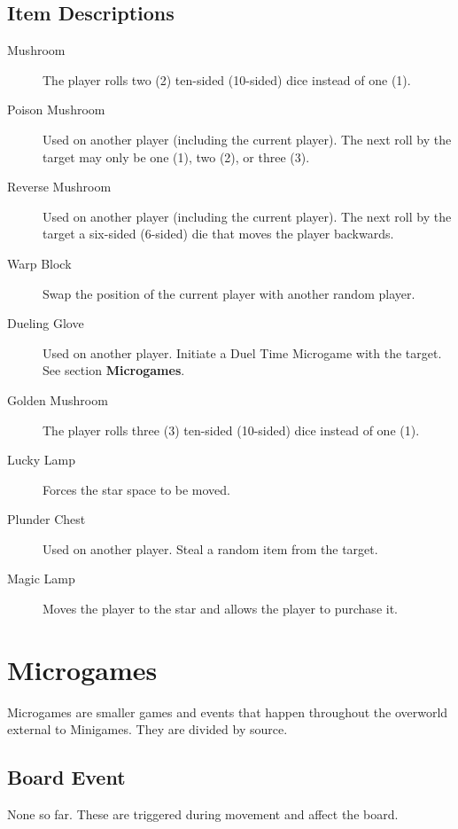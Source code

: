 \documentclass{article}
\begin{document}
\subsection{Item Descriptions}
\begin{description}
\item[Mushroom] The player rolls two (2) ten-sided (10-sided) dice instead
of one (1).

\item[Poison Mushroom] Used on another player (including the current player).
The next roll by the target may only be one (1), two (2), or three (3).

\item[Reverse Mushroom] Used on another player (including the current player).
The next roll by the target a six-sided (6-sided) die that moves the player backwards.

\item[Warp Block] Swap the position of the current player with another random player.

\item[Dueling Glove] Used on another player. Initiate a Duel Time Microgame with the target.
See section \textbf{Microgames}.

\item[Golden Mushroom] The player rolls three (3) ten-sided (10-sided) dice instead
of one (1).

\item[Lucky Lamp] Forces the star space to be moved.

\item[Plunder Chest] Used on another player. Steal a random item from the target.

\item[Magic Lamp] Moves the player to the star and allows the player to purchase it.
\end{description}

\section{Microgames}

Microgames are smaller games and events that happen throughout the overworld external
to Minigames.  They are divided by source.

\subsection{Board Event}

None so far. These are triggered during movement and affect the board.
\end{document}
